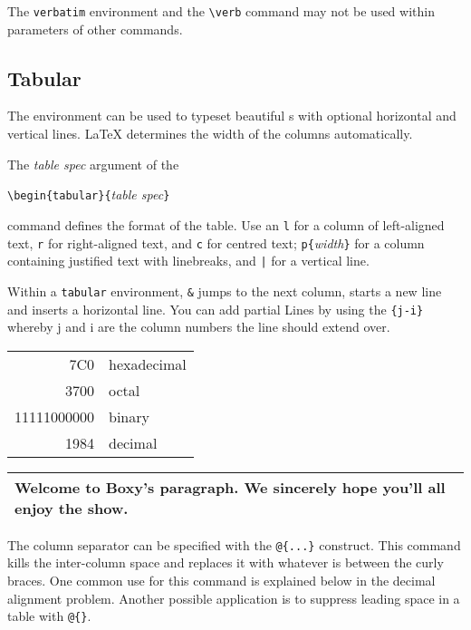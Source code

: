 The \texttt{verbatim} environment and the \verb|\verb| command may not be used
within parameters of other commands.


\subsection{Tabular}

The  environment can be used to typeset beautiful
s with optional horizontal and vertical lines. \LaTeX{}
determines the width of the columns automatically.

The \emph{table spec} argument of the 
\begin{lscommand}
\verb|\begin{tabular}{|\emph{table spec}\verb|}|
\end{lscommand} 
\noindent command defines the format of the table. Use an \texttt{l} for a column of
left-aligned text, \texttt{r} for right-aligned text, and \texttt{c} for
centred text; \verb|p{|\emph{width}\verb|}| for a column containing justified
text with linebreaks, and \verb.|. for a vertical line.
 
Within a \texttt{tabular} environment, \verb|&| jumps to the next column, \ci{\bs}
starts a new line and  inserts a horizontal line.
You can add partial Lines by using the \verb|{j-i}| whereby
j and i are the column numbers the line should extend over.


\begin{example}
\begin{tabular}{|r|l|}
\hline
7C0 & hexadecimal \\
3700 & octal \\ \cline{2-2}
11111000000 & binary \\
\hline \hline
1984 & decimal \\
\hline
\end{tabular}
\end{example}

\begin{example}
\begin{tabular}{|p{4.7cm}|}
\hline
Welcome to Boxy's paragraph.
We sincerely hope you'll 
all enjoy the show.\\
\hline 
\end{tabular}
\end{example}

The column separator can be specified with the \verb|@{...}|
construct. This command kills the inter-column space and replaces it
with whatever is between the curly braces.  One common use for
this command is explained below in the decimal alignment problem.
Another possible application is to suppress leading space in a table with
\verb|@{}|.

